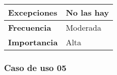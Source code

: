 \begin{longtable}{l|l}
\begin{minipage}{0.25\columnwidth}
\textbf{Excepciones} 
\end{minipage}
&
\begin{minipage}{0.65\columnwidth}
No las hay
\end{minipage}
\\ \hline

\begin{minipage}{0.25\columnwidth}
\textbf{Frecuencia} 
\end{minipage}
&
\begin{minipage}{0.65\columnwidth}
Moderada
\end{minipage}
\\ \hline

\begin{minipage}{0.25\columnwidth}
\textbf{Importancia} 
\end{minipage}
&
\begin{minipage}{0.65\columnwidth}
Alta
\end{minipage}
\\ \hline
\end{longtable}

\subsubsection{Caso de uso 05}

